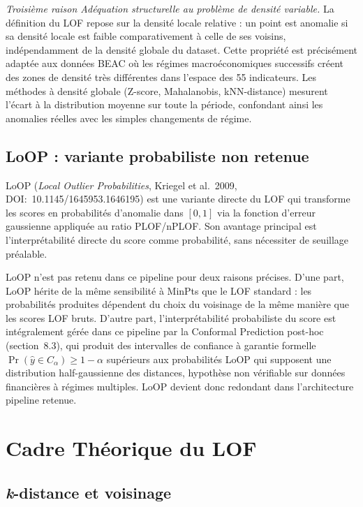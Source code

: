 \documentclass[12pt,a4paper]{article}
\begin{document}
\textit{Troisième raison  Adéquation structurelle au problème de densité
variable.} La définition du LOF repose sur la densité locale relative : un
point est anomalie si sa densité locale est faible comparativement à celle
de ses voisins, indépendamment de la densité globale du dataset. Cette
propriété est précisément adaptée aux données BEAC où les régimes
macroéconomiques successifs créent des zones de densité très différentes dans
l'espace des 55 indicateurs. Les méthodes à densité globale (Z-score,
Mahalanobis, kNN-distance) mesurent l'écart à la distribution moyenne sur
toute la période, confondant ainsi les anomalies réelles avec les simples
changements de régime.

\subsection{LoOP : variante probabiliste non retenue}
\label{subsec:loop}

LoOP (\textit{Local Outlier Probabilities}, Kriegel et al.\ 2009,
DOI:~10.1145/1645953.1646195) est une variante directe du LOF qui transforme
les scores en probabilités d'anomalie dans $[0,1]$ via la fonction d'erreur
gaussienne appliquée au ratio PLOF/nPLOF. Son avantage principal est
l'interprétabilité directe du score comme probabilité, sans nécessiter de
seuillage préalable.

LoOP n'est pas retenu dans ce pipeline pour deux raisons précises. D'une part,
LoOP hérite de la même sensibilité à MinPts que le LOF standard : les
probabilités produites dépendent du choix du voisinage de la même manière que
les scores LOF bruts. D'autre part, l'interprétabilité probabiliste du score
est intégralement gérée dans ce pipeline par la Conformal Prediction post-hoc
(section~8.3), qui produit des intervalles de confiance à garantie formelle
$\Pr(\hat{y} \in C_\alpha) \geq 1 - \alpha$  supérieurs aux probabilités
LoOP qui supposent une distribution half-gaussienne des distances, hypothèse
non vérifiable sur données financières à régimes multiples. LoOP devient donc
redondant dans l'architecture pipeline retenue.
\section{Cadre Théorique du LOF}

\subsection{\textit{k}-distance et voisinage}
\end{document}
